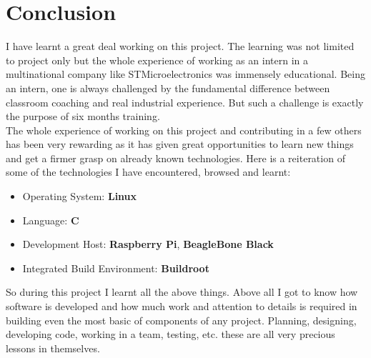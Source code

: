 \section{Conclusion}
I have learnt a great deal working on this project. The learning was not limited to project only but the whole experience of working as an intern in a multinational company like STMicroelectronics was immensely educational. Being an intern, one is always challenged by the fundamental difference between classroom coaching and real industrial experience. But such a challenge is exactly the purpose of six months training.\\
The whole experience of working on this project and contributing in a few others has been very rewarding as it has given great opportunities to learn new things and get a firmer grasp on already known technologies. Here is a reiteration of some of the technologies I have encountered, browsed and learnt:
\begin{itemize}
	\item Operating System: \textbf{Linux}
	\item Language: \textbf{C}
	\item Development Host: \textbf{Raspberry Pi}, \textbf{BeagleBone Black}
	\item Integrated Build Environment: \textbf{Buildroot}
\end{itemize}
So during this project I learnt all the above things. Above all I got to know how software is developed and how much work and attention to details is required in building even the most basic of components of any project. Planning, designing, developing code, working in a team, testing, etc. these are all very precious lessons in themselves. 

